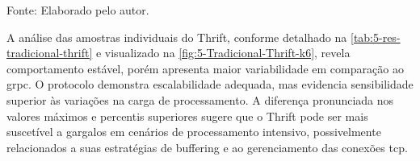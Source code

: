 \begin{table}[H]
\centering
\caption{Thrift comparado com os demais protocolos — Cenário Tradicional (\acrshort{grpc}/\gls{rest} em $\Delta$\% vs Thrift)}
\label{tab:5-res-tradicional-thrift}
{\par \raggedright \footnotesize Fonte: Elaborado pelo autor.\par}
\end{table}

A análise das amostras individuais do Thrift, conforme detalhado na \autoref{tab:5-res-tradicional-thrift} e visualizado na \autoref{fig:5-Tradicional-Thrift-k6}, revela comportamento estável, porém apresenta maior variabilidade em comparação ao \gls{grpc}. O protocolo demonstra escalabilidade adequada, mas evidencia sensibilidade superior às variações na carga de processamento. A diferença pronunciada nos valores máximos e percentis superiores sugere que o Thrift pode ser mais suscetível a gargalos em cenários de processamento intensivo, possivelmente relacionados a suas estratégias de buffering e ao gerenciamento das conexões \acrshort{tcp}.

